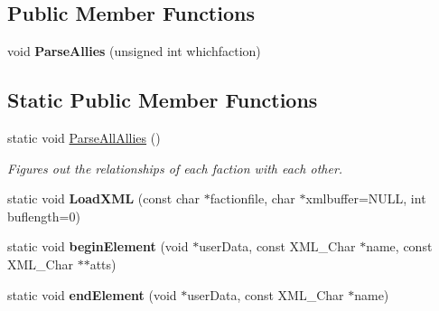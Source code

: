 \subsection*{Public Member Functions}
\begin{DoxyCompactItemize}
\item 
void {\bfseries Parse\+Allies} (unsigned int whichfaction)\hypertarget{classFaction_aa0995211c1562192bb3378cf3479fb54}{}\label{classFaction_aa0995211c1562192bb3378cf3479fb54}

\end{DoxyCompactItemize}
\subsection*{Static Public Member Functions}
\begin{DoxyCompactItemize}
\item 
static void \hyperlink{classFaction_aa73bc9f12725112e8ba2d7d6b56feb55}{Parse\+All\+Allies} ()\hypertarget{classFaction_aa73bc9f12725112e8ba2d7d6b56feb55}{}\label{classFaction_aa73bc9f12725112e8ba2d7d6b56feb55}

\begin{DoxyCompactList}\small\item\em Figures out the relationships of each faction with each other. \end{DoxyCompactList}\item 
static void {\bfseries Load\+X\+ML} (const char $\ast$factionfile, char $\ast$xmlbuffer=N\+U\+LL, int buflength=0)\hypertarget{classFaction_ad5a0ce446dc8ac913b46f8633b0d1bd6}{}\label{classFaction_ad5a0ce446dc8ac913b46f8633b0d1bd6}

\item 
static void {\bfseries begin\+Element} (void $\ast$user\+Data, const X\+M\+L\+\_\+\+Char $\ast$name, const X\+M\+L\+\_\+\+Char $\ast$$\ast$atts)\hypertarget{classFaction_a8c01f1e57a5d44273dc3a1a730a64c0f}{}\label{classFaction_a8c01f1e57a5d44273dc3a1a730a64c0f}

\item 
static void {\bfseries end\+Element} (void $\ast$user\+Data, const X\+M\+L\+\_\+\+Char $\ast$name)\hypertarget{classFaction_a433ae03bd3366a470bf1215cf18c9140}{}\label{classFaction_a433ae03bd3366a470bf1215cf18c9140}

\end{DoxyCompactItemize}
